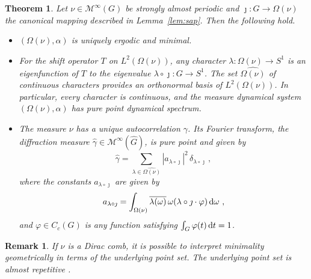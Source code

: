 \documentclass[11pt, a4wide]{amsart}
\newcommand{\MTB}{\mathcal{M}^{\infty}(G)}
\newtheorem{theorem}[lemma]{Theorem}
\newtheorem{remark}[lemma]{Remark}
\numberwithin{lemma}{section}
\begin{document}
\begin{theorem} \label{stronglyAlmostPeriodic-implies-purePointSpectrum}
Let $\nu \in \MTB$ be strongly almost periodic and $\jmath: G\longrightarrow \Omega (\nu)$ the canonical mapping described in Lemma~\ref{lem:sap}.  Then the following hold.
%
\begin{itemize}
\item[(i)] $(\Omega(\nu), \alpha)$ is uniquely ergodic and minimal.
\item[(ii)]
For the shift operator $T$ on $L^2(\Omega(\nu))$, any character $\lambda:\Omega(\nu) \to S^1$ is an eigenfunction of $T$ to the eigenvalue $\lambda \circ \jmath: G\to S^1$.  The set $\widehat{\Omega(\nu)}$ of continuous
characters  provides an orthonormal basis of $L^2(\Omega(\nu))$.  In particular, every character is continuous, and the measure dynamical system
$(\Omega(\nu), \alpha)$ has pure point dynamical spectrum.

\item[(iii)] The measure $\nu$ has a unique autocorrelation $\gamma$. Its Fourier transform, the diffraction measure  $\widehat{\gamma}\in \mathcal M^\infty(\widehat G)$, is pure point and given by
%
\begin{displaymath}
\widehat{\gamma} = \sum_{\lambda \in \widehat{\Omega(\nu)}} |a_{\lambda\circ \jmath }|^2\, \delta_{\lambda \circ \jmath} \, ,
\end{displaymath}
%
where the constants $a_{\lambda\circ \jmath}$ are given by
%
\begin{displaymath}
a_{\lambda\circ \jmath}=\int_{\Omega(\nu)} \overline{\lambda(\omega)} \, \omega(\lambda\circ \jmath \cdot \varphi) \, {\rm d} \omega \ ,
\end{displaymath}
%
and $\varphi\in C_c(G)$ is any function satisfying $\int_G \varphi(t) \, {\rm d}t =1$.
\end{itemize}
\end{theorem}

\begin{remark}
If $\nu$ is a Dirac comb, it is possible to interpret minimality geometrically in terms of the underlying point set. The underlying point set is almost repetitive \cite[Thm.~3.11]{FR14}.
\end{remark}
\end{document}
